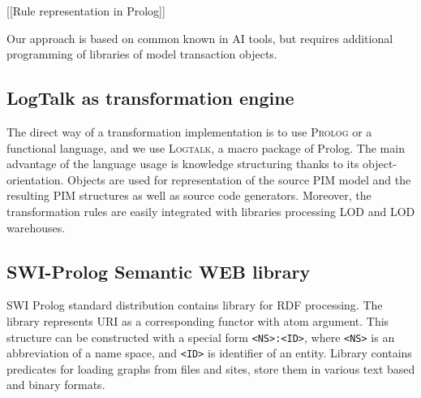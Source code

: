 \documentclass[conference]{IEEEtran}
\begin{document}
[[Rule representation in Prolog]]



Our approach is based on common known in AI tools, but requires additional programming of libraries of model transaction objects.

\subsection{LogTalk as transformation engine}
\label{sec:logtalk-engine}

The direct way of a transformation implementation is to use \textsc{Prolog} or a functional language, and we use \textsc{Logtalk}, a macro package of Prolog.  The main advantage of the language usage is knowledge structuring thanks to its object-orientation.  Objects are used for representation of the source PIM model and the resulting PIM structures as well as source code generators.  Moreover, the transformation rules are easily integrated with libraries processing LOD and LOD warehouses.


\subsection{SWI-Prolog Semantic WEB library}
\label{sec:swi-sw}

SWI Prolog standard distribution contains library for RDF processing.  The library represents URI as a corresponding functor with atom argument. This structure can be constructed with a special form \texttt{<NS>:<ID>}, where \texttt{<NS>} is an abbreviation of a name space, and \texttt{<ID>} is identifier of an entity.  Library contains predicates for loading graphs from files and sites, store them in various text based and binary formats.
\end{document}
